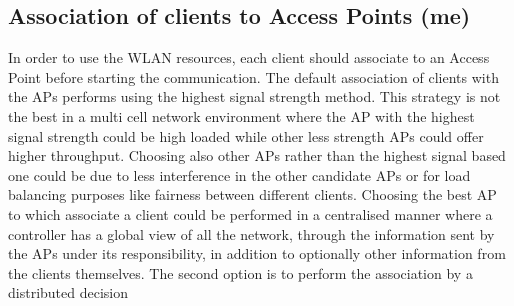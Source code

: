 \documentclass[journal,transmag]{IEEEtran}
\begin{document}
\subsection{Association of clients to Access Points (me)}
In order to use the WLAN resources, each client should associate to an Access Point before starting the communication. The default association of clients with the APs performs using the highest signal strength method. This strategy is not the best in a multi cell network environment where the AP with the highest signal strength could be high loaded while other less strength APs could offer higher throughput. Choosing also other APs rather than the highest signal based one could be due to less interference in the other candidate APs or for load balancing purposes like fairness between different clients. Choosing the best AP to which associate a client could be performed in a centralised manner \cite{10approximate_optimisation_proportional,14AP_association_multirate_WLAN,15Demand_aware_load_balance_WLAN,16throughput_optimisation_association_bandwidth,14optimalAP_INFOCOM,12Network_cooperation_AP_association,11proportional_fairness_power_control,16AP_association_optimisation_fairness,07optimal_association_MSWIM,15AP_association_MIMO,08AP_assignement_algorithms,08proportional_fairness_multiRate_LAN,06proportional_fairness_3G_networks,04Fairness_load_balancing_WLAN,07fairness_load_balancing_LAN,17QOS_AP_selection,16centralised_framework_AP_selection_fittingness_factor,10Dyson,08Design_high_wifi_entreprise,06client_channel_WLAN,06practical_queue_based_AP_association,13sociality_aware_AP_slection,15fuzzy_load_balancing_802.11,05optimal_AP_selection,05optimal_association_stations,08load_balancing_QOS,09achieving_effeciency_fairness_vehicular,09dynamic_association_load_balancing,10game_load_balancing_association,10joint_bandwidth_association,10dynamic_load_balancing_industrial,14load_handoff_SDN,15load_performance_enhancement} where a controller has a global view of all the network, through the information sent by the APs under its responsibility, in addition to optionally other information from the clients themselves. The second option is to perform the association by a distributed decision 
\end{document}

